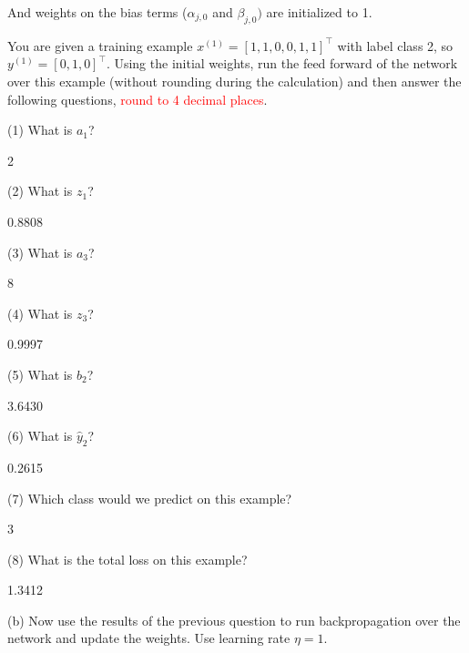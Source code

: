 And weights on the bias terms (${\alpha}_{j,0}$ and ${\beta}_{j,0})$ are initialized to 1.

You are given a training example $x^{(1)}=[1,1,0,0,1,1]^{\top}$ with label class 2, so $y^{(1)}=[0,1,0]^{\top}$. Using the initial weights, run the feed forward of the network over this example (without rounding during the calculation) and then answer the following questions, \textcolor{red}{round to 4 decimal places}.

(1) What is $a_1$?
\begin{tcolorbox}[fit,height=1cm, width=2cm, blank, borderline={1pt}{-2pt}]
2
\end{tcolorbox}

(2) What is $z_1$?
\begin{tcolorbox}[fit,height=1cm, width=2cm, blank, borderline={1pt}{-2pt}]
    0.8808
\end{tcolorbox}

(3) What is $a_3$?
\begin{tcolorbox}[fit,height=1cm, width=2cm, blank, borderline={1pt}{-2pt}]
8
\end{tcolorbox}

(4) What is $z_3$?
\begin{tcolorbox}[fit,height=1cm, width=2cm, blank, borderline={1pt}{-2pt}]
0.9997
\end{tcolorbox}

(5) What is $b_2$?
\begin{tcolorbox}[fit,height=1cm, width=2cm, blank, borderline={1pt}{-2pt}]
3.6430
\end{tcolorbox}

(6) What is $\hat{y}_2$?
\begin{tcolorbox}[fit,height=1cm, width=2cm, blank, borderline={1pt}{-2pt}]
0.2615
\end{tcolorbox}

(7) Which class would we predict on this example?
\begin{tcolorbox}[fit,height=1cm, width=2cm, blank, borderline={1pt}{-2pt}]
3
\end{tcolorbox}

(8) What is the total loss on this example?
\begin{tcolorbox}[fit,height=1cm, width=2cm, blank, borderline={1pt}{-2pt}]
1.3412
\end{tcolorbox}



(b)  Now use the results of the previous question to run backpropagation over the network and update the weights. Use learning rate $\eta=1$.

